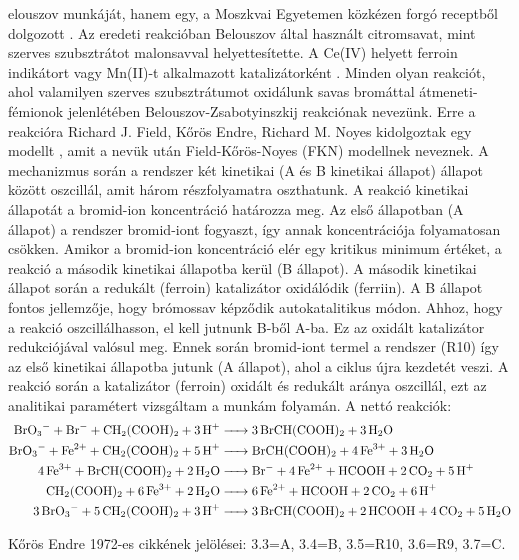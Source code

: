 elouszov munkáját, hanem egy, a Moszkvai Egyetemen közkézen forgó receptből dolgozott \cite{winfree1984prehistory}. Az eredeti reakcióban Belouszov által használt citromsavat, mint szerves szubsztrátot malonsavval helyettesítette. A Ce(IV) helyett ferroin indikátort vagy Mn(II)-t alkalmazott katalizátorként \cite{miklososzcillalo}.
Minden olyan reakciót, ahol valamilyen szerves szubsztrátumot oxidálunk savas bromáttal átmeneti-fémionok jelenlétében Belouszov-Zsabotyinszkij reakciónak nevezünk. Erre a reakcióra Richard J. Field, Kőrös Endre, Richard M. Noyes kidolgoztak egy modellt \cite{noyes1972oscillations}, amit a nevük után Field-Kőrös-Noyes (FKN) modellnek neveznek. A mechanizmus során a rendszer két kinetikai (A és B kinetikai állapot) állapot között oszcillál, amit három részfolyamatra oszthatunk. A reakció kinetikai állapotát a bromid-ion koncentráció határozza meg.
Az első állapotban (A állapot) a rendszer bromid-iont fogyaszt, így annak koncentrációja folyamatosan csökken. Amikor a bromid-ion koncentráció elér egy kritikus minimum értéket, a reakció a második kinetikai állapotba kerül (B állapot). A második kinetikai állapot során a redukált (ferroin) katalizátor oxidálódik (ferriin). A B állapot fontos jellemzője, hogy brómossav képződik autokatalitikus módon. Ahhoz, hogy a reakció oszcillálhasson, el kell jutnunk B-ből A-ba. Ez az oxidált katalizátor redukciójával valósul meg. Ennek során bromid-iont termel a rendszer (R10) így az első kinetikai állapotba jutunk (A állapot), ahol a ciklus újra kezdetét veszi. A reakció során a katalizátor (ferroin) oxidált és redukált aránya oszcillál, ezt az analitikai paramétert vizsgáltam a munkám folyamán. A nettó reakciók:\\

\small
\begin{align}
\small
\ce {BrO3^- + Br- + CH2(COOH)2 + 3 H+ &-> 3 BrCH(COOH)2 + 3 H2O}\\
\ce {BrO3^- + Fe^2+ + CH2(COOH)2 + 5 H+ &-> BrCH(COOH)2 + 4 Fe^3+ + 3 H2O}\\
\ce {4 Fe^3+ + BrCH(COOH)2 + 2 H2O &-> Br- + 4 Fe^2+ + HCOOH + 2 CO2 + 5 H+}\\
\ce {CH2(COOH)2 + 6 Fe^3+ + 2 H2O &-> 6 Fe^2+ + HCOOH + 2 CO2 + 6 H+}\\
\ce {3 BrO3^- + 5 CH2(COOH)2 + 3 H+ &-> 3 BrCH(COOH)2 + 2 HCOOH + 4 CO2 + 5 H2O}
\large
\end{align}
\large


Kőrös Endre 1972-es cikkének \cite{noyes1972oscillations} jelölései: 3.3=A, 3.4=B, 3.5=R10, 3.6=R9, 3.7=C.

